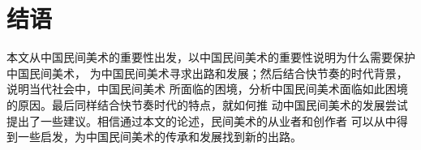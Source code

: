 \section{结语}
本文从中国民间美术的重要性出发，以中国民间美术的重要性说明为什么需要保护中国民间美术，
为中国民间美术寻求出路和发展；然后结合快节奏的时代背景，说明当代社会中，中国民间美术
所面临的困境，分析中国民间美术面临如此困境的原因。最后同样结合快节奏时代的特点，就如何推
动中国民间美术的发展尝试提出了一些建议。相信通过本文的论述，民间美术的从业者和创作者
可以从中得到一些启发，为中国民间美术的传承和发展找到新的出路。
